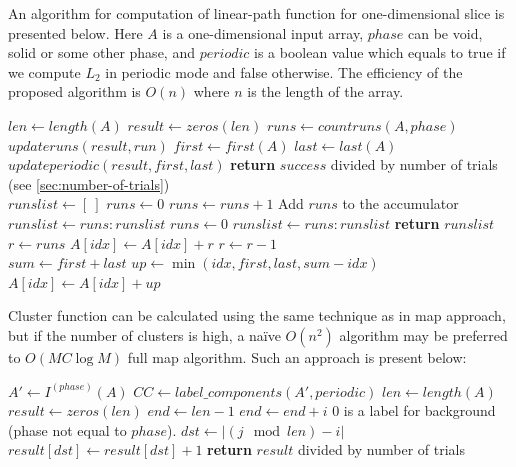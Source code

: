 \documentclass[1p]{elsarticle}
\begin{document}
An algorithm for computation of linear-path function for one-dimensional slice
is presented below. Here $A$ is a one-dimensional input array, $phase$ can be
void, solid or some other phase, and $periodic$ is a boolean value which equals
to true if we compute $L_2$ in periodic mode and false otherwise. The efficiency
of the proposed algorithm is $O(n)$ where $n$ is the length of the array.
\begin{algorithmic}[1]
    \State $len \gets length(A)$
    \State $result \gets zeros(len)$
    \State $runs \gets countruns(A, phase)$
      \State $updateruns(result, run)$
    \EndFor
      \State $first \gets first(A)$
      \State $last \gets last(A)$
        \State $updateperiodic(result, first, last)$
      \EndIf
    \EndIf
    \State \textbf{return} $success$ divided by number of trials
    (see \cref{sec:number-of-trials})
  \EndProcedure
  \\
    \State $runslist \gets [\ ]$
    \State $runs \gets 0$
        \State $runs \gets runs + 1$
        \Comment Add $runs$ to the accumulator
        \State $runslist \gets runs:runslist$
        \State $runs \gets 0$
      \EndIf
    \EndFor
      \State $runslist \gets runs:runslist$
    \EndIf
    \State \textbf{return} $runslist$
  \EndProcedure
  \\
    \State $r \gets runs$
      \State $A[idx] \gets A[idx] + r$
      \State $r \gets r - 1$
    \EndFor
  \EndProcedure
  \\
    \State $sum \gets first + last$
      \State $up \gets \min(idx, first, last, sum - idx)$
      \State $A[idx] \gets A[idx] + up$
    \EndFor
  \EndProcedure
\end{algorithmic}

Cluster function can be calculated using the same technique as in map approach,
but if the number of clusters is high, a naïve $O(n^2)$ algorithm may be
preferred to $O(MC \log M)$ full map algorithm. Such an approach is present below:
\begin{algorithmic}[1]
    \State $A' \gets I^{(phase)}(A)$
    \State $CC \gets label\_components(A', periodic)$
    \State $len \gets length(A)$
    \State $result \gets zeros(len)$
        \State $end \gets len-1$
          \State $end \gets end + i$
        \EndIf
            \Comment $0$ is a label for background (phase not equal to $phase$).
            \State $dst \gets |(j \mod len) - i|$
            \State $result[dst] \gets result[dst] + 1$
          \EndIf
        \EndFor
      \EndFor
    \EndFor
    \State \textbf{return} $result$ divided by number of trials
  \EndProcedure
\end{algorithmic}
\end{document}
